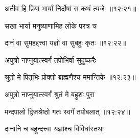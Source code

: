 
{\devanagarifont अतीव हि प्रियां भार्यां निर्दोषां स कथं त्यजेः {॥१२:२१॥} \veg\dontdisplaylinenum }%

{\devanagarifont सखा भार्या मनुष्याणामिह लोके परत्र च \thinspace{\dandab} \dontdisplaylinenum }%


{\devanagarifont दानं वा सुमहद्दत्त्वा यज्ञो वा सुबहुः कृतः {॥१२:२२॥} \veg\dontdisplaylinenum }%

{\devanagarifont अपुत्रो नाप्नुयात्स्वर्गं तपोभिर्वा सुदुष्करैः \thinspace{\dandab} \dontdisplaylinenum }%


{\devanagarifont श्रुतो मे पितृभिः प्रोक्तो ब्राह्मणैश्च ममान्तिके {॥१२:२३॥} \veg\dontdisplaylinenum }%

{\devanagarifont अपुत्रो नाप्नुयात्स्वर्गं श्रुतं मे बहुशः पुरा \thinspace{\dandab} \dontdisplaylinenum }%


{\devanagarifont मन्दपालो द्विजश्रेष्ठो गतः स्वर्गं तपोबलात् {॥१२:२४॥} \veg\dontdisplaylinenum }%

{\devanagarifont दानानि च बहून्दत्त्वा यज्ञांश्च विविधांस्तथा \thinspace{\dandab} \dontdisplaylinenum }%

